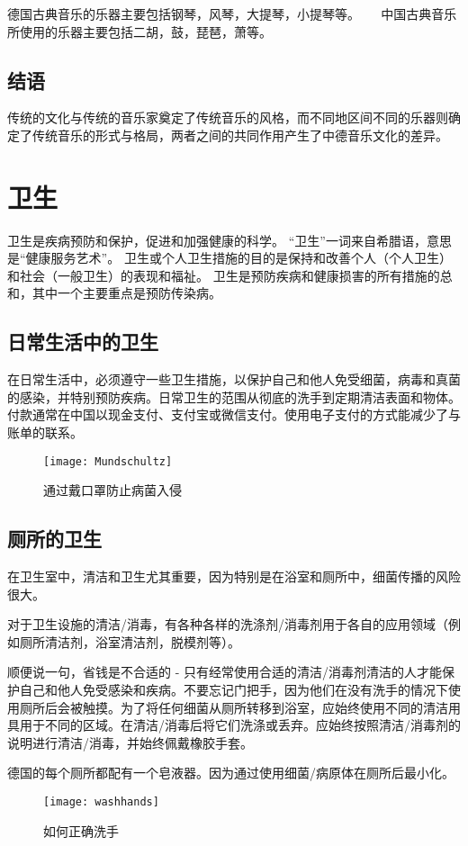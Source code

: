     德国古典音乐的乐器主要包括钢琴，风琴，大提琴，小提琴等。 
    
    中国古典音乐所使用的乐器主要包括二胡，鼓，琵琶，萧等。 

\subsection{结语}
    传统的文化与传统的音乐家奠定了传统音乐的风格，而不同地区间不同的乐器则确定了传统音乐的形式与格局，两者之间的共同作用产生了中德音乐文化的差异。


\section{卫生}
    卫生是疾病预防和保护，促进和加强健康的科学。 “卫生”一词来自希腊语，意思是“健康服务艺术”。 卫生或个人卫生措施的目的是保持和改善个人（个人卫生）和社会（一般卫生）的表现和福祉。 卫生是预防疾病和健康损害的所有措施的总和，其中一个主要重点是预防传染病。

\subsection{日常生活中的卫生}
    在日常生活中，必须遵守一些卫生措施，以保护自己和他人免受细菌，病毒和真菌的感染，并特别预防疾病。日常卫生的范围从彻底的洗手到定期清洁表面和物体。付款通常在中国以现金支付、支付宝或微信支付。使用电子支付的方式能减少了与账单的联系。
    \begin{figure}[htb]
        \centering
        \texttt{[image: Mundschultz]}
        \caption{通过戴口罩防止病菌入侵}
    \end{figure}

\subsection{厕所的卫生}
    在卫生室中，清洁和卫生尤其重要，因为特别是在浴室和厕所中，细菌传播的风险很大。

    对于卫生设施的清洁/消毒，有各种各样的洗涤剂/消毒剂用于各自的应用领域（例如厕所清洁剂，浴室清洁剂，脱模剂等）。

    顺便说一句，省钱是不合适的 - 只有经常使用合适的清洁/消毒剂清洁的人才能保护自己和他人免受感染和疾病。不要忘记门把手，因为他们在没有洗手的情况下使用厕所后会被触摸。为了将任何细菌从厕所转移到浴室，应始终使用不同的清洁用具用于不同的区域。在清洁/消毒后将它们洗涤或丢弃。应始终按照清洁/消毒剂的说明进行清洁/消毒，并始终佩戴橡胶手套。

    德国的每个厕所都配有一个皂液器。因为通过使用细菌/病原体在厕所后最小化。
    \begin{figure}[htb]
        \centering
        \texttt{[image: washhands]}
        \caption{如何正确洗手}
    \end{figure}

